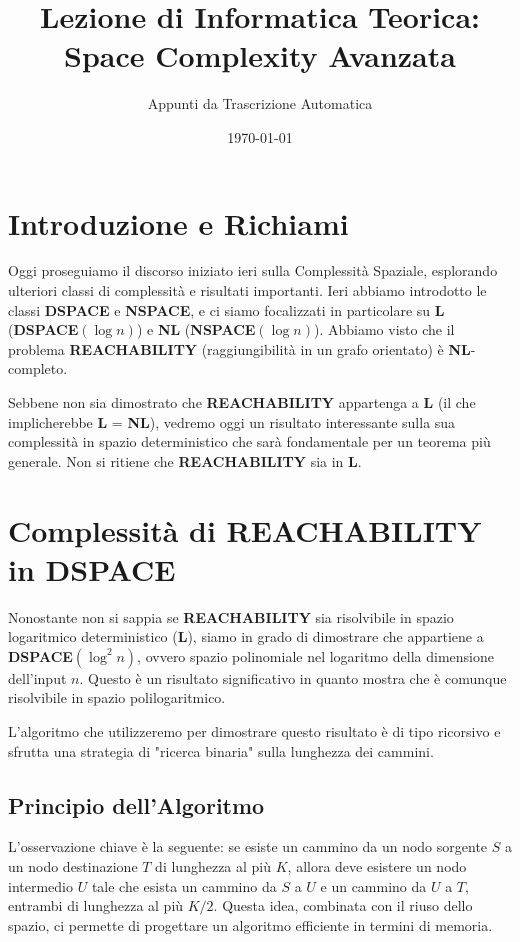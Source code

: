 \documentclass[a4paper]{article}
\title{Lezione di Informatica Teorica: Space Complexity Avanzata}
\author{Appunti da Trascrizione Automatica}
\date{\today}
\theoremstyle{definition} %
\begin{document}
\maketitle
\tableofcontents
\newpage

\section{Introduzione e Richiami}
Oggi proseguiamo il discorso iniziato ieri sulla Complessità Spaziale, esplorando ulteriori classi di complessità e risultati importanti. Ieri abbiamo introdotto le classi \textbf{DSPACE} e \textbf{NSPACE}, e ci siamo focalizzati in particolare su \textbf{L} (\textbf{DSPACE}$(\log n)$) e \textbf{NL} (\textbf{NSPACE}$(\log n)$). Abbiamo visto che il problema \textbf{REACHABILITY} (raggiungibilità in un grafo orientato) è \textbf{NL}-completo.

Sebbene non sia dimostrato che \textbf{REACHABILITY} appartenga a \textbf{L} (il che implicherebbe \textbf{L} = \textbf{NL}), vedremo oggi un risultato interessante sulla sua complessità in spazio deterministico che sarà fondamentale per un teorema più generale. Non si ritiene che \textbf{REACHABILITY} sia in \textbf{L}.

\section{Complessità di REACHABILITY in DSPACE}
Nonostante non si sappia se \textbf{REACHABILITY} sia risolvibile in spazio logaritmico deterministico (\textbf{L}), siamo in grado di dimostrare che appartiene a \textbf{DSPACE}$(\log^2 n)$, ovvero spazio polinomiale nel logaritmo della dimensione dell'input $n$. Questo è un risultato significativo in quanto mostra che è comunque risolvibile in spazio polilogaritmico.

L'algoritmo che utilizzeremo per dimostrare questo risultato è di tipo ricorsivo e sfrutta una strategia di "ricerca binaria" sulla lunghezza dei cammini.

\subsection{Principio dell'Algoritmo}
L'osservazione chiave è la seguente: se esiste un cammino da un nodo sorgente $S$ a un nodo destinazione $T$ di lunghezza al più $K$, allora deve esistere un nodo intermedio $U$ tale che esista un cammino da $S$ a $U$ e un cammino da $U$ a $T$, entrambi di lunghezza al più $K/2$. Questa idea, combinata con il riuso dello spazio, ci permette di progettare un algoritmo efficiente in termini di memoria.
\end{document}
